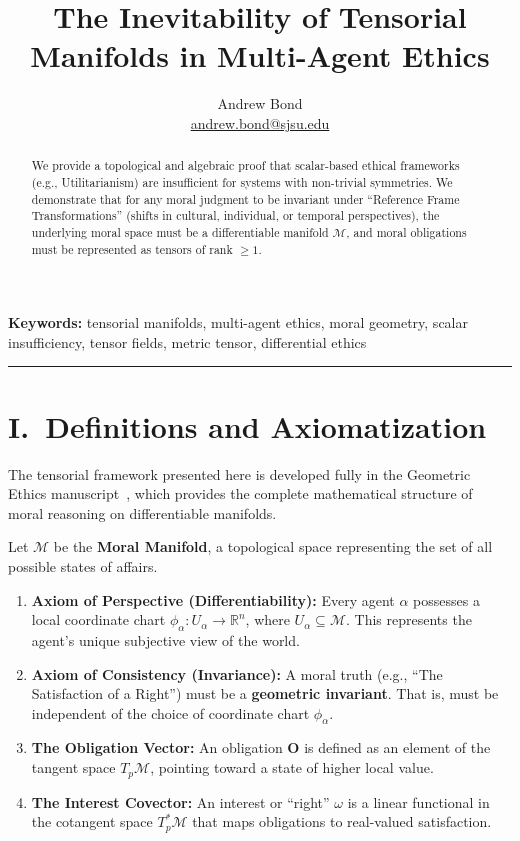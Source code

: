 \documentclass[12pt]{article}
\title{The Inevitability of Tensorial Manifolds in Multi-Agent Ethics}
\author{Andrew Bond\\
\href{mailto:andrew.bond@sjsu.edu}{andrew.bond@sjsu.edu}}
\date{}
\theoremstyle{remark}
\begin{document}
\maketitle

\noindent\textbf{Keywords:} tensorial manifolds, multi-agent ethics, moral geometry, scalar insufficiency, tensor fields, metric tensor, differential ethics

\begin{abstract}
We provide a topological and algebraic proof that scalar-based ethical
frameworks (e.g., Utilitarianism) are insufficient for systems with non-trivial
symmetries. We demonstrate that for any moral judgment to be invariant under
``Reference Frame Transformations'' (shifts in cultural, individual, or temporal
perspectives), the underlying moral space must be a differentiable manifold
$\mathcal{M}$, and moral obligations must be represented as tensors of rank
$\geq 1$.
\end{abstract}

\bigskip
\hrule
\bigskip

\section*{I.\ Definitions and Axiomatization}

The tensorial framework presented here is developed fully in the Geometric Ethics manuscript~\cite{bond2026ge}, which provides the complete mathematical structure of moral reasoning on differentiable manifolds.

Let $\mathcal{M}$ be the \textbf{Moral Manifold}, a topological space
representing the set of all possible states of affairs.

\begin{enumerate}
    \item \textbf{Axiom of Perspective (Differentiability):} Every agent
    $\alpha$ possesses a local coordinate chart $\phi_\alpha : U_\alpha \to
    \mathbb{R}^n$, where $U_\alpha \subseteq \mathcal{M}$. This represents the
    agent's unique subjective view of the world.

    \item \textbf{Axiom of Consistency (Invariance):} A moral truth (e.g.,
    ``The Satisfaction of a Right'') must be a \textbf{geometric invariant}.
    That is, must be independent of the choice of coordinate chart
    $\phi_\alpha$.

    \item \textbf{The Obligation Vector:} An obligation $\mathbf{O}$ is defined
    as an element of the tangent space $T_p\mathcal{M}$, pointing toward a
    state of higher local value.

    \item \textbf{The Interest Covector:} An interest or ``right'' $\omega$ is
    a linear functional in the cotangent space $T_p^*\mathcal{M}$ that maps
    obligations to real-valued satisfaction.
\end{enumerate}
\end{document}
